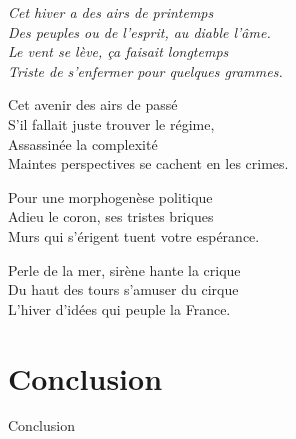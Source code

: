 




\raggedleft
\textit{
Cet hiver a des airs de printemps\\
Des peuples ou de l'esprit, au diable l'âme.\\
Le vent se lève, ça faisait longtemps\\
Triste de s'enfermer pour quelques grammes.\\
}

\medskip

\raggedright

Cet avenir des airs de passé\\
S'il fallait juste trouver le régime,\\
Assassinée la complexité\\
Maintes perspectives se cachent en les crimes.\\

\medskip
\raggedleft

Pour une morphogenèse politique\\
Adieu le coron, ses tristes briques\\
Murs qui s'érigent tuent votre espérance.\\

\medskip
\raggedright

Perle de la mer, sirène hante la crique\\
Du haut des tours s'amuser du cirque\\
L'hiver d'idées qui peuple la France.\\







\newpage






\chapter*{Conclusion}{Conclusion}











